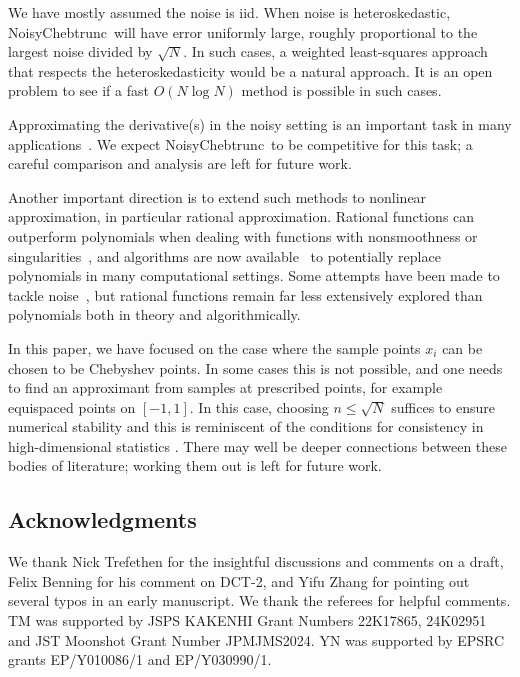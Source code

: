 \documentclass[final,onefignum,onetabnum]{siamart220329}
\def\mainalg{NoisyChebtrunc}
\begin{document}
We have mostly assumed the noise is iid. When noise is heteroskedastic, \mainalg\ will have error uniformly large, roughly proportional to the largest noise divided by $\sqrt{N}$. In such cases, a weighted least-squares approach that respects the heteroskedasticity would be a natural approach. It is an open problem to see if a fast $O(N\log N)$ method is possible in such cases. 

Approximating the derivative(s) in the noisy setting is an important task in many applications~\cite{fioretti1989accurate,ragozin1983error,schafer2011savitzky,zhukweighted}. We expect \mainalg\ to be competitive for this task; a careful comparison and analysis are left for future work.

Another important direction is to extend such methods to nonlinear approximation, in particular rational approximation. 
Rational functions can outperform polynomials when dealing with functions with nonsmoothness or singularities~\cite{trefethenatap}, and algorithms are now available~\cite{nakatsukasa2018aaa} to potentially replace polynomials in many computational settings. Some attempts have been made to tackle noise~\cite{wilber2022data}, but rational functions remain far less extensively explored than polynomials both in theory and algorithmically. 

In this paper, we have focused on the case where the sample points $x_i$ can be chosen to be Chebyshev points. In some cases this is not possible, and one needs to find an approximant from samples at prescribed points, for example equispaced points on $[-1,1]$.  In this case, choosing $n \leq \sqrt{N}$ suffices to ensure numerical stability and this is reminiscent of the conditions for consistency in high-dimensional statistics \cite{portnoy1984asymptotic,yohai1979asymptotic}. There may well be deeper connections between these bodies of literature; working them out is left for future work.

\subsection*{Acknowledgments}
We thank Nick Trefethen for the insightful discussions and comments on a draft, Felix Benning for his comment on DCT-2, and Yifu Zhang for pointing out several typos in an early manuscript. 
We thank the referees for helpful comments.
TM was supported by JSPS KAKENHI Grant Numbers 22K17865, 24K02951 and JST Moonshot Grant Number JPMJMS2024.
YN was supported by EPSRC grants EP/Y010086/1 and EP/Y030990/1.










\end{document}
